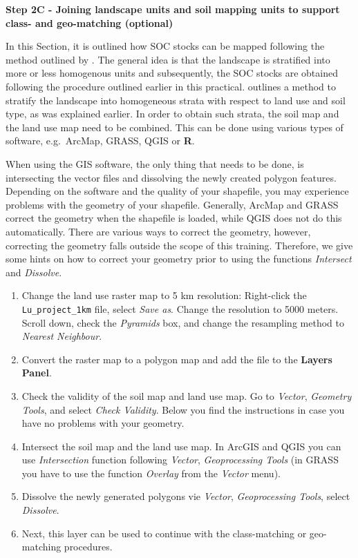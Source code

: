 \documentclass[10pt,b5paper,]{book}
\providecommand{\tightlist}{%
  \setlength{\itemsep}{0pt}\setlength{\parskip}{0pt}}
\theoremstyle{definition}
\theoremstyle{definition}
\theoremstyle{definition}
\theoremstyle{remark}
\begin{document}
\textbf{Step 2C - Joining landscape units and soil mapping units to
support class- and geo-matching (optional)}

In this Section, it is outlined how SOC stocks can be mapped following
the method outlined by \citet{lettens2004soil}. The general idea is that
the landscape is stratified into more or less homogenous units and
subsequently, the SOC stocks are obtained following the procedure
outlined earlier in this practical. \citet{lettens2004soil} outlines a
method to stratify the landscape into homogeneous strata with respect to
land use and soil type, as was explained earlier. In order to obtain
such strata, the soil map and the land use map need to be combined. This
can be done using various types of software, e.g.~ArcMap, GRASS, QGIS or
\textbf{R}.

When using the GIS software, the only thing that needs to be done, is
intersecting the vector files and dissolving the newly created polygon
features. Depending on the software and the quality of your shapefile,
you may experience problems with the geometry of your shapefile.
Generally, ArcMap and GRASS correct the geometry when the shapefile is
loaded, while QGIS does not do this automatically. There are various
ways to correct the geometry, however, correcting the geometry falls
outside the scope of this training. Therefore, we give some hints on how
to correct your geometry prior to using the functions \emph{Intersect}
and \emph{Dissolve}.

\begin{enumerate}
\def\labelenumi{\arabic{enumi}.}
\tightlist
\item
  Change the land use raster map to 5 km resolution: Right-click the
  \texttt{Lu\_project\_1km} file, select \emph{Save as}. Change the
  resolution to 5000 meters. Scroll down, check the \emph{Pyramids} box,
  and change the resampling method to \emph{Nearest Neighbour}.
\item
  Convert the raster map to a polygon map and add the file to the
  \textbf{Layers Panel}.
\item
  Check the validity of the soil map and land use map. Go to
  \emph{Vector}, \emph{Geometry Tools}, and select \emph{Check
  Validity}. Below you find the instructions in case you have no
  problems with your geometry.
\item
  Intersect the soil map and the land use map. In ArcGIS and QGIS you
  can use \emph{Intersection} function following \emph{Vector},
  \emph{Geoprocessing Tools} (in GRASS you have to use the function
  \emph{Overlay} from the \emph{Vector} menu).
\item
  Dissolve the newly generated polygons vie \emph{Vector},
  \emph{Geoprocessing Tools}, select \emph{Dissolve}.
\item
  Next, this layer can be used to continue with the class-matching or
  geo-matching procedures.
\end{enumerate}
\end{document}
